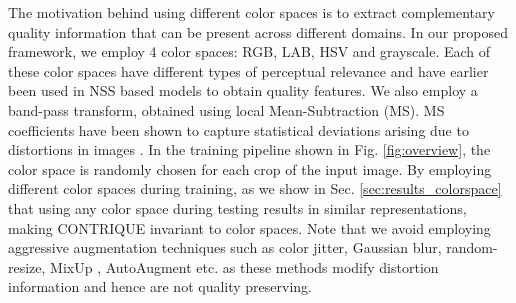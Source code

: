 \documentclass[journal]{IEEEtran}
\begin{document}
The motivation behind using different color spaces is to extract complementary quality information that can be present across different domains. In our proposed framework, we employ 4 color spaces: RGB, LAB, HSV and grayscale. Each of these color spaces have different types of perceptual relevance and have earlier been used in NSS based models \cite{ghadiyaram2017perceptual,tu2021rapique} to obtain quality features. We also employ a band-pass transform, obtained using local Mean-Subtraction (MS). MS coefficients have been shown to capture statistical deviations arising due to distortions in images \cite{bampis2017speed, bampis2018spatiotemporal,madhusudana2021st}. In the training pipeline shown in Fig. \ref{fig:overview}, the color space is randomly chosen for each crop of the input image. By employing different color spaces during training, as we show in Sec. \ref{sec:results_colorspace} that using any color space during testing results in similar representations, making CONTRIQUE invariant to color spaces. Note that we avoid employing aggressive augmentation techniques such as color jitter, Gaussian blur, random-resize, MixUp \cite{zhang2017mixup}, AutoAugment \cite{cubuk2019autoaugment} etc. as these methods modify distortion information and hence are not quality preserving.
\end{document}
